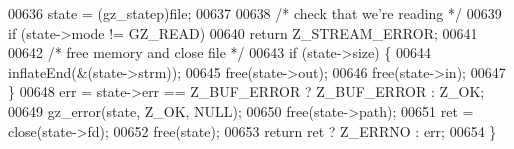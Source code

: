 \begin{DoxyCode}
00636     state = (gz\_statep)file;
00637 
00638     \textcolor{comment}{/* check that we're reading */}
00639     \textcolor{keywordflow}{if} (state->mode != GZ\_READ)
00640         \textcolor{keywordflow}{return} Z\_STREAM\_ERROR;
00641 
00642     \textcolor{comment}{/* free memory and close file */}
00643     \textcolor{keywordflow}{if} (state->size) \{
00644         inflateEnd(&(state->strm));
00645         free(state->out);
00646         free(state->in);
00647     \}
00648     err = state->err == Z\_BUF\_ERROR ? Z\_BUF\_ERROR : Z\_OK;
00649     gz\_error(state, Z\_OK, NULL);
00650     free(state->path);
00651     ret = close(state->fd);
00652     free(state);
00653     \textcolor{keywordflow}{return} ret ? Z\_ERRNO : err;
00654 \}
\end{DoxyCode}
